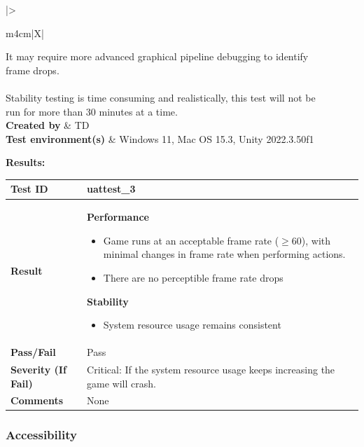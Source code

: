 \documentclass[11pt, a4paper]{article}
\begin{document}
\begin{center}
\begin{tabularx}{\linewidth}{|>{\raggedright\arraybackslash}m{4cm}|X|}
{        It may require more advanced graphical pipeline debugging to identify \\ frame drops. \\ \\
        Stability testing is time consuming and realistically, this test will not be \\ run for more than 30 minutes at a time.
    } \\
    \hline
    \textbf{Created by} & TD \\
    \hline
    \textbf{Test environment(s)} & Windows 11, Mac OS 15.3, Unity 2022.3.50f1 \\
    \hline
\end{tabularx}
\end{center}

\newpage

\noindent \textbf{Results:}

\begin{center}
\begin{tabularx}{\linewidth}{|>{\raggedright\arraybackslash}m{4cm}|X|}
    \hline
    \textbf{Test ID} & uattest\_3 \\
    \hline
    \textbf{Result} &
    \textbf{Performance}
    \begin{itemize}
        \item Game runs at an acceptable frame rate ($\geq 60$), with minimal changes in frame rate when performing actions.
        \item There are no perceptible frame rate drops
    \end{itemize}
    \textbf{Stability}
    \begin{itemize}
        \item System resource usage remains consistent
    \end{itemize}
    \\
    \hline
    \textbf{Pass/Fail} & Pass \\
    \hline
    \textbf{Severity (If Fail)} & Critical: If the system resource usage keeps increasing the game will crash. \\
    \hline
    \textbf{Comments} & None \\
    \hline
\end{tabularx}
\end{center}

\newpage

\subsubsection{Accessibility}
\end{document}
